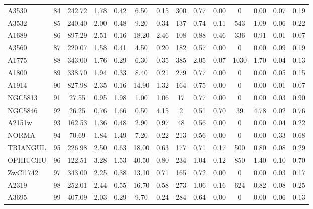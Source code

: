 \documentclass[10pt,aps,pra,reprint,amsmath,amsfonts,amssymb,showpacs,nofootinbib,floatfix]{revtex4-1}
\newcommand{\vst}{\vspace{-0.14mm}}
\begin{document}
\begin{table}
\begin{minipage}{2.0\columnwidth}
\begin{tabular}{l  c c c c c c c c c c c c c}
A3530    &  84 & 242.72 &   1.78 &   0.42 &   6.50 &   0.15 & 300 &   0.77 &   0.00 &    0 &   0.00 &   0.07 &   0.19 \vst \\
A3532    &  85 & 240.40 &   2.00 &   0.48 &   9.20 &   0.34 & 137 &   0.74 &   0.11 &  543 &   1.09 &   0.06 &   0.22 \vst \\
A1689    &  86 & 897.29 &   2.51 &   0.16 &  18.20 &   2.46 & 108 &   0.88 &   0.46 &  336 &   0.91 &   0.01 &   0.07 \vst \\
A3560    &  87 & 220.07 &   1.58 &   0.41 &   4.50 &   0.20 & 182 &   0.57 &   0.00 &    0 &   0.00 &   0.09 &   0.19 \vst \\
A1775    &  88 & 343.00 &   1.76 &   0.29 &   6.30 &   0.35 & 385 &   2.05 &   0.07 & 1030 &   1.70 &   0.04 &   0.13 \vst \\
A1800    &  89 & 338.70 &   1.94 &   0.33 &   8.40 &   0.21 & 279 &   0.77 &   0.00 &    0 &   0.00 &   0.05 &   0.15 \vst \\
A1914    &  90 & 827.98 &   2.35 &   0.16 &  14.90 &   1.32 & 164 &   0.75 &   0.00 &    0 &   0.00 &   0.01 &   0.07 \vst \\
NGC5813  &  91 &  27.55 &   0.95 &   1.98 &   1.00 &   1.06 &  17 &   0.77 &   0.00 &    0 &   0.00 &   0.03 &   0.90 \vst \\
NGC5846  &  92 &  26.25 &   0.76 &   1.66 &   0.50 &   4.15 &   2 &   0.51 &   0.70 &   39 &   4.78 &   0.02 &   0.76 \vst \\
A2151w   &  93 & 162.53 &   1.36 &   0.48 &   2.90 &   0.97 &  48 &   0.56 &   0.00 &    0 &   0.00 &   0.04 &   0.22 \vst \\
NORMA    &  94 &  70.69 &   1.84 &   1.49 &   7.20 &   0.22 & 213 &   0.56 &   0.00 &    0 &   0.00 &   0.33 &   0.68 \vst \\
TRIANGUL &  95 & 226.98 &   2.50 &   0.63 &  18.00 &   0.63 & 177 &   0.71 &   0.17 &  500 &   0.80 &   0.08 &   0.29 \vst \\
OPHIUCHU &  96 & 122.51 &   3.28 &   1.53 &  40.50 &   0.80 & 234 &   1.04 &   0.12 &  850 &   1.40 &   0.10 &   0.70 \vst \\
ZwCl1742 &  97 & 343.00 &   2.25 &   0.38 &  13.10 &   0.71 & 165 &   0.72 &   0.00 &    0 &   0.00 &   0.03 &   0.17 \vst \\
A2319    &  98 & 252.01 &   2.44 &   0.55 &  16.70 &   0.58 & 273 &   1.06 &   0.16 &  624 &   0.82 &   0.08 &   0.25 \vst \\
A3695    &  99 & 407.09 &   2.03 &   0.29 &   9.70 &   0.24 & 284 &   0.64 &   0.00 &    0 &   0.00 &   0.06 &   0.13 \vst \\

\end{tabular}
\end{minipage}
\end{table}
\end{document}
